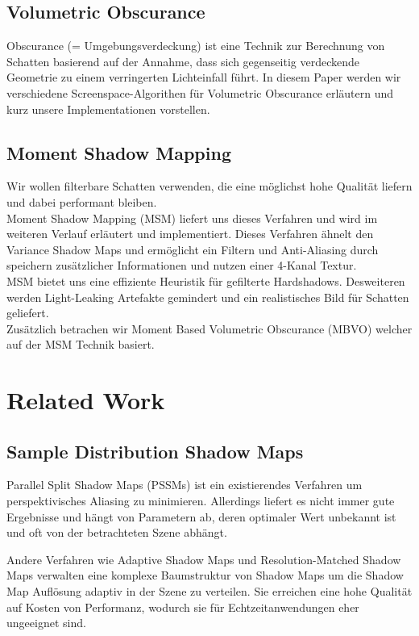 \documentclass[runningheaders,a4paper]{llncs}
\begin{document}
\subsection{Volumetric Obscurance}
Obscurance (= Umgebungsverdeckung) ist eine Technik zur Berechnung von Schatten basierend auf der Annahme,
dass sich gegenseitig verdeckende Geometrie zu einem verringerten Lichteinfall führt.
In diesem Paper werden wir verschiedene Screenspace-Algorithen für Volumetric Obscurance erläutern und kurz unsere Implementationen vorstellen.


\subsection{Moment Shadow Mapping}
Wir wollen filterbare Schatten verwenden, die eine möglichst hohe Qualität liefern und dabei performant bleiben.\\
Moment Shadow Mapping (MSM) liefert uns dieses Verfahren und wird im weiteren Verlauf erläutert und implementiert. Dieses Verfahren ähnelt den Variance Shadow Maps und ermöglicht ein Filtern und Anti-Aliasing durch speichern zusätzlicher Informationen und nutzen einer 4-Kanal Textur.\\MSM bietet uns eine effiziente Heuristik für gefilterte Hardshadows. Desweiteren werden Light-Leaking Artefakte gemindert und ein realistisches Bild für Schatten geliefert.\\
Zusätzlich betrachen wir Moment Based Volumetric Obscurance (MBVO) welcher auf der MSM Technik basiert.

\section{Related Work}

\subsection{Sample Distribution Shadow Maps}

Parallel Split Shadow Maps (PSSMs) \cite{pssm} ist ein existierendes Verfahren um perspektivisches Aliasing zu minimieren.
Allerdings liefert es nicht immer gute Ergebnisse und hängt von Parametern ab, deren optimaler Wert unbekannt ist und oft von der betrachteten Szene abhängt.

Andere Verfahren wie Adaptive Shadow Maps \cite{asm} und Resolution-Matched Shadow Maps \cite{rmsm} verwalten eine komplexe Baumstruktur von Shadow Maps um die Shadow Map Auflösung adaptiv in der Szene zu verteilen.
Sie erreichen eine hohe Qualität auf Kosten von Performanz, wodurch sie für Echtzeitanwendungen eher ungeeignet sind.
\end{document}
